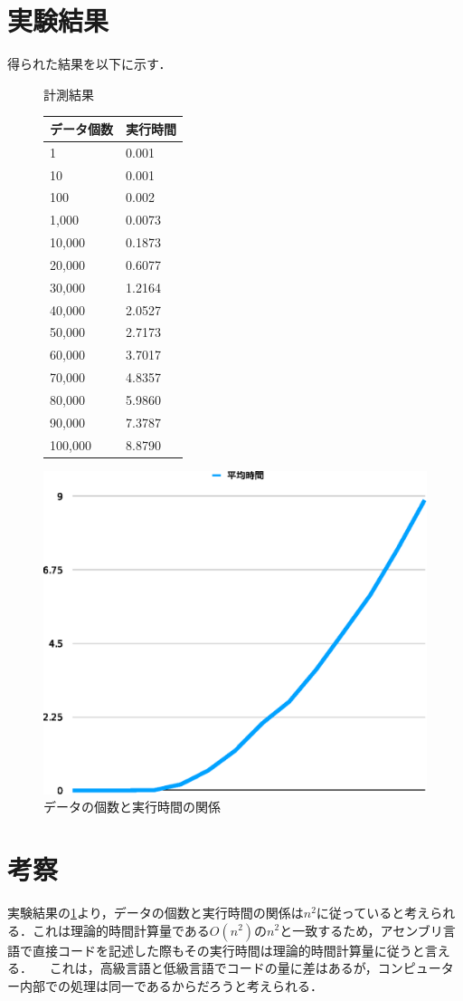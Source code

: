 \section{実験結果}
得られた結果を以下に示す．
\begin{figure}[h]
  \begin{minipage}{0.45\textwidth}
  \centering
  \caption{計測結果}
  \begin{tabular}{ll}
    データ個数 & 実行時間\\ \hline
    1 & 0.001\\
    10 & 0.001\\
    100 & 0.002\\
    1,000 & 0.0073\\
    10,000 & 0.1873\\
    20,000 & 0.6077\\
    30,000 & 1.2164\\
    40,000 & 2.0527\\
    50,000 & 2.7173\\
    60,000 & 3.7017\\
    70,000 & 4.8357\\
    80,000 & 5.9860\\
    90,000 & 7.3787\\
    100,000 & 8.8790\\ \hline
  \end{tabular}
  \end{minipage}
  \begin{minipage}{0.45\textwidth}
    \caption{データの個数と実行時間の関係}
    \label{fig:実行時間グラフ}
      \includegraphics[scale=0.5]{exdata.eps}
    \end{minipage}
\end{figure}

\section{考察}
実験結果の\ref{fig:実行時間グラフ}より，データの個数と実行時間の関係は$n^2$に従っていると考えられる．これは理論的時間計算量である$O(n^2)$の$n^2$と一致するため，アセンブリ言語で直接コードを記述した際もその実行時間は理論的時間計算量に従うと言える．
 \ \ これは，高級言語と低級言語でコードの量に差はあるが，コンピューター内部での処理は同一であるからだろうと考えられる．
